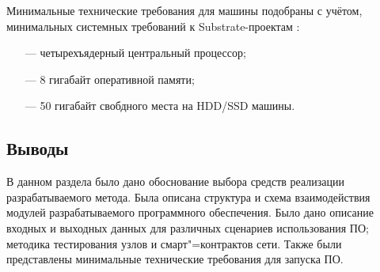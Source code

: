 Минимальные технические требования для машины подобраны с учётом, минимальных системных требований к Substrate-проектам \cite{substrate}:
\begin{itemize}[leftmargin=1.6\parindent]
	\item[---] четырехъядерный центральный процессор;
	\item[---] 8 гигабайт оперативной памяти;
	\item[---] 50 гигабайт свобдного места на HDD/SSD машины.
\end{itemize}




\subsection*{Выводы}

В данном раздела было дано обоснование выбора средств реализации разрабатываемого метода. Была описана структура и схема взаимодействия модулей разрабатываемого программного обеспечения. Было дано описание входных и выходных данных для различных сценариев использования ПО; методика тестирования узлов и смарт"=контрактов сети. Также были представлены минимальные технические требования для запуска ПО.

\pagebreak